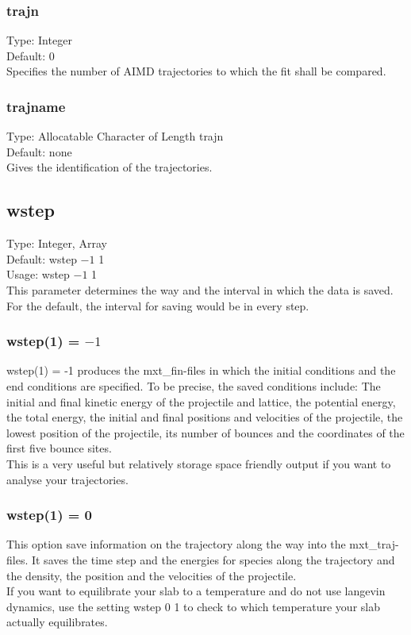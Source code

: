 \documentclass[twoside, 11pt, titlepage, captions=nooneline, a4paper, headsepline]{scrbook}%
\begin{document}
\subsubsection*{trajn}
Type: Integer\\
Default: 0\\
Specifies the number of AIMD trajectories to which the fit shall be compared.

\subsubsection*{trajname}
Type: Allocatable Character of Length trajn\\
Default: none\\
Gives the identification of the trajectories.

\subsection*{wstep}
Type: Integer, Array\\
Default: wstep $-1$ 1\\
Usage: wstep $-1$ 1\\
This parameter determines the way and the interval in which the data is saved. For the default, the interval for saving would be in every step.
\subsubsection*{wstep(1) = $-1$}
wstep(1) = -1 produces the mxt\_fin-files in which the initial conditions and the end conditions are specified. To be precise, the saved conditions include: The initial and final kinetic energy of the projectile and lattice, the potential energy, the total energy, the initial and final positions and velocities of the projectile, the lowest position of the projectile, its number of bounces and the coordinates of the first five bounce sites.\\
This is a very useful but relatively storage space friendly output if you want to analyse your trajectories.
\subsubsection*{wstep(1) = 0}
This option save information on the trajectory along the way into the mxt\_traj-files. It saves the time step and the energies for species along the trajectory and the density, the position and the velocities of the projectile. \\
If you want to equilibrate your slab to a temperature and do not use langevin dynamics, use the setting wstep 0 1 to check to which temperature your slab actually equilibrates.
\end{document}
